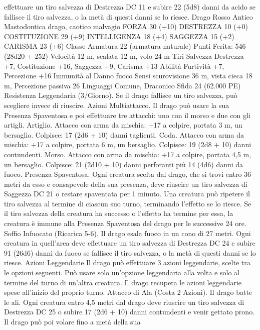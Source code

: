 \begin{multicols}{2}
effettuare un tiro salvezza di Destrezza DC 11 e subire 22 (5d8)
danni da acido se fallisce il tiro salvezza, o la metà di questi
danni se lo riesce.
Drago Rosso Antico
Mastodontica drago, caotico malvagio
FORZA 30 (+10)
DESTREZZA 10 (+0)
COSTITUZIONE 29 (+9)
INTELLIGENZA 18 (+4)
SAGGEZZA 15 (+2)
CARISMA 23 (+6)
Classe Armatura 22 (armatura naturale)
\hspace*{0pt}\hfill{Punti Ferita}: 546 (28d20 + 252)
Velocità 12 m, scalata 12 m, volo 24 m
Tiri Salvezza Destrezza +7, Costituzione +16, Saggezza +9,
Carisma +13
Abilità Furtività +7, Percezione +16
Immunità al Danno fuoco
Sensi scurovisione 36 m, vista cieca 18 m, Percezione passiva 26
Linguaggi Comune, Draconico
Sfida 24 (62.000 PE)
Resistenza Leggendaria (3/Giorno). Se il drago fallisce un tiro
salvezza, può scegliere invece di riuscire.
Azioni
Multiattacco. Il drago può usare la sua Presenza Spaventosa e
poi effettuare tre attacchi: uno con il morso e due con gli artigli.
Artiglio. Attacco con arma da mischia: +17 a colpire, portata 3
m, un bersaglio.
Colpisce: 17 (2d6 + 10) danni taglienti.
Coda. Attacco con arma da mischia: +17 a colpire, portata 6 m,
un bersaglio.
Colpisce: 19 (2d8 + 10) danni contundenti.
Morso. Attacco con arma da mischia: +17 a colpire, portata 4,5
m, un bersaglio.
Colpisce: 21 (2d10 + 10) danni perforanti più 14 (4d6) danni da
fuoco.
Presenza Spaventosa. Ogni creatura scelta dal drago, che si trovi
entro 36 metri da esso e consapevole della sua presenza, deve
riuscire un tiro salvezza di Saggezza DC 21 o restare spaventata
per 1 minuto. Una creatura può ripetere il tiro salvezza al termine
di ciascun suo turno, terminando l’effetto se lo riesce. Se il tiro
salvezza della creatura ha successo o l’effetto ha termine per
essa, la creatura è immune alla Presenza Spaventosa del drago
per le successive 24 ore.
Soffio Infuocato (Ricarica 5-6). Il drago esala fuoco in un cono
di 27 metri. Ogni creatura in quell’area deve effettuare un tiro
salvezza di Destrezza DC 24 e subire 91 (26d6) danni da fuoco
se fallisce il tiro salvezza, o la metà di questi danni se lo riesce.
Azioni Leggendarie
Il drago può effettuare 3 azioni leggendarie, scelte tra le opzioni
seguenti. Può usare solo un’opzione leggendaria alla volta e solo
al termine del turno di un’altra creatura. Il drago recupera le
azioni leggendarie spese all’inizio del proprio turno.
Attacco di Ala (Costa 2 Azioni). Il drago batte le ali. Ogni
creatura entro 4,5 metri dal drago deve riuscire un tiro salvezza
di Destrezza DC 25 o subire 17 (2d6 + 10) danni contundenti e
venir gettato prono. Il drago può poi volare fino a metà della sua

\end{multicols}
